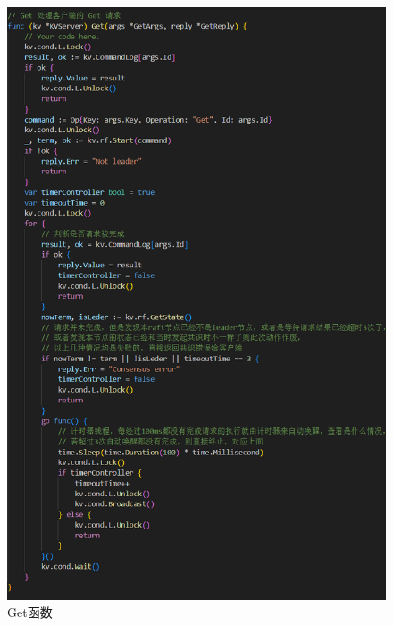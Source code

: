 \documentclass[]{article}
\begin{document}
\begin{itemize}
\begin{figure}[H]
			\includegraphics[height=0.95\textheight]{./3A/server-Get.png}
			\caption{Get函数}
		\end{figure}
		\begin{figure}[H]
			\centering

\end{figure}
\end{itemize}
\end{document}
